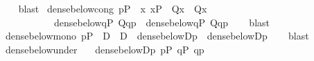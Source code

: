 \begin{isabellebody}
%
\isadelimproof
\ \ %
\endisadelimproof
%
\isatagproof
{}\isamarkupfalse%
\ blast%
\endisatagproof
{\isafoldproof}%
%
\isadelimproof
\isanewline
%
\endisadelimproof
\isanewline
{}\isamarkupfalse%
\ dense{\isacharunderscore}{\kern0pt}below{\isacharunderscore}{\kern0pt}cong{\isacharprime}{\kern0pt}{\isacharcolon}{\kern0pt}\ {\isachardoublequoteopen}p{\isasymin}P\ {\isasymLongrightarrow}\ {\isasymlbrakk}{\isasymAnd}x{\isachardot}{\kern0pt}\ x{\isasymin}P\ {\isasymLongrightarrow}\ Q{\isacharparenleft}{\kern0pt}x{\isacharparenright}{\kern0pt}\ {\isasymlongleftrightarrow}\ Q{\isacharprime}{\kern0pt}{\isacharparenleft}{\kern0pt}x{\isacharparenright}{\kern0pt}{\isasymrbrakk}\ {\isasymLongrightarrow}\ \isanewline
\ \ \ \ \ \ \ \ \ \ \ dense{\isacharunderscore}{\kern0pt}below{\isacharparenleft}{\kern0pt}{\isacharbraceleft}{\kern0pt}q{\isasymin}P{\isachardot}{\kern0pt}\ Q{\isacharparenleft}{\kern0pt}q{\isacharparenright}{\kern0pt}{\isacharbraceright}{\kern0pt}{\isacharcomma}{\kern0pt}p{\isacharparenright}{\kern0pt}\ {\isasymlongleftrightarrow}\ dense{\isacharunderscore}{\kern0pt}below{\isacharparenleft}{\kern0pt}{\isacharbraceleft}{\kern0pt}q{\isasymin}P{\isachardot}{\kern0pt}\ Q{\isacharprime}{\kern0pt}{\isacharparenleft}{\kern0pt}q{\isacharparenright}{\kern0pt}{\isacharbraceright}{\kern0pt}{\isacharcomma}{\kern0pt}p{\isacharparenright}{\kern0pt}{\isachardoublequoteclose}\isanewline
%
\isadelimproof
\ \ %
\endisadelimproof
%
\isatagproof
{}\isamarkupfalse%
\ blast%
\endisatagproof
{\isafoldproof}%
%
\isadelimproof
\isanewline
%
\endisadelimproof
\isanewline
{}\isamarkupfalse%
\ dense{\isacharunderscore}{\kern0pt}below{\isacharunderscore}{\kern0pt}mono{\isacharcolon}{\kern0pt}\ {\isachardoublequoteopen}p{\isasymin}P\ {\isasymLongrightarrow}\ D\ {\isasymsubseteq}\ D{\isacharprime}{\kern0pt}\ {\isasymLongrightarrow}\ dense{\isacharunderscore}{\kern0pt}below{\isacharparenleft}{\kern0pt}D{\isacharcomma}{\kern0pt}p{\isacharparenright}{\kern0pt}\ {\isasymLongrightarrow}\ dense{\isacharunderscore}{\kern0pt}below{\isacharparenleft}{\kern0pt}D{\isacharprime}{\kern0pt}{\isacharcomma}{\kern0pt}p{\isacharparenright}{\kern0pt}{\isachardoublequoteclose}\isanewline
%
\isadelimproof
\ \ %
\endisadelimproof
%
\isatagproof
{}\isamarkupfalse%
\ blast%
\endisatagproof
{\isafoldproof}%
%
\isadelimproof
\isanewline
%
\endisadelimproof
\isanewline
{}\isamarkupfalse%
\ dense{\isacharunderscore}{\kern0pt}below{\isacharunderscore}{\kern0pt}under{\isacharcolon}{\kern0pt}\isanewline
\ \ \ {\isachardoublequoteopen}dense{\isacharunderscore}{\kern0pt}below{\isacharparenleft}{\kern0pt}D{\isacharcomma}{\kern0pt}p{\isacharparenright}{\kern0pt}{\isachardoublequoteclose}\ {\isachardoublequoteopen}p{\isasymin}P{\isachardoublequoteclose}\ {\isachardoublequoteopen}q{\isasymin}P{\isachardoublequoteclose}\ {\isachardoublequoteopen}q{\isasympreceq}p{\isachardoublequoteclose}\isanewline

\end{isabellebody}
